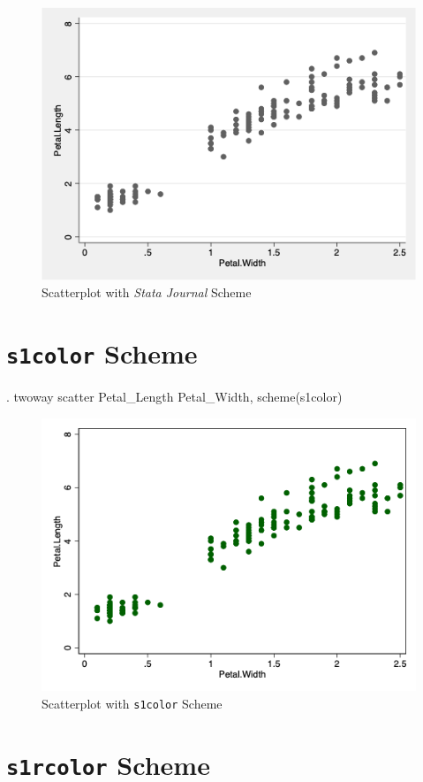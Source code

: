 \documentclass[
]{article}
\begin{document}
\begin{figure}
\centering
\includegraphics[width=0.75\linewidth]{sjscatter.png}
\caption{Scatterplot with \emph{Stata Journal} Scheme}
\end{figure}

\hypertarget{s1color-scheme}{%
\section{\texorpdfstring{\texttt{s1color}
Scheme}{s1color Scheme}}\label{s1color-scheme}}

\begin{stlog}
. twoway scatter Petal_Length Petal_Width, scheme(s1color)
\end{stlog}



\begin{figure}
\centering
\includegraphics[width=0.75\linewidth]{s1colorscatter.png}
\caption{Scatterplot with \texttt{s1color} Scheme}
\end{figure}

\hypertarget{s1rcolor-scheme}{%
\section{\texorpdfstring{\texttt{s1rcolor}
Scheme}{s1rcolor Scheme}}\label{s1rcolor-scheme}}
\end{document}
